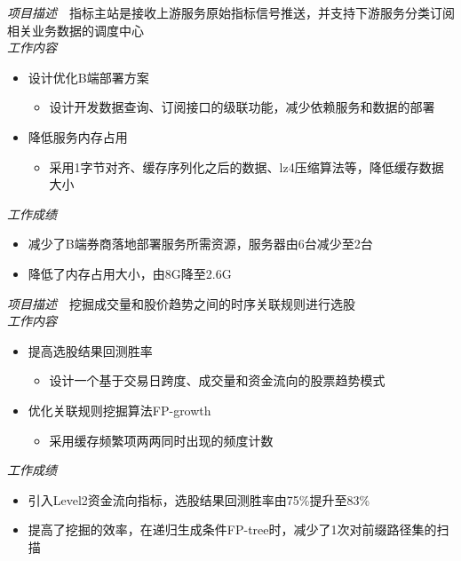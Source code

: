 \documentclass{resume}
\begin{document}
\begin{spacing}{1.5}%
\textit{项目描述}\ \ 指标主站是接收上游服务原始指标信号推送，并支持下游服务分类订阅相关业务数据的调度中心\\
\textit{工作内容}
\begin{itemize}
        \item 设计优化B端部署方案
            \begin{itemize}
                \item 设计开发数据查询、订阅接口的级联功能，减少依赖服务和数据的部署
            \end{itemize}
        \item 降低服务内存占用
            \begin{itemize}
                \item 采用1字节对齐、缓存序列化之后的数据、lz4压缩算法等，降低缓存数据大小
            \end{itemize}
        \end{itemize}
\textit{工作成绩}
\begin{itemize}
        \item 减少了B端券商落地部署服务所需资源，服务器由6台减少至2台
        \item 降低了内存占用大小，由8G降至2.6G
        \end{itemize}
\end{spacing}

\begin{spacing}{1.5}%
\textit{项目描述}\ \ 挖掘成交量和股价趋势之间的时序关联规则进行选股\\
\textit{工作内容}
\begin{itemize}
        \item 提高选股结果回测胜率
        \begin{itemize}
                \item 设计一个基于交易日跨度、成交量和资金流向的股票趋势模式
            \end{itemize}
        \item 优化关联规则挖掘算法FP-growth
        \begin{itemize}
                \item 采用缓存频繁项两两同时出现的频度计数
            \end{itemize}
        \end{itemize}
\textit{工作成绩}
\begin{itemize}
        \item 引入Level2资金流向指标，选股结果回测胜率由75\%提升至83\%
        \item 提高了挖掘的效率，在递归生成条件FP-tree时，减少了1次对前缀路径集的扫描
        \end{itemize}
\end{spacing}

\iffalse
\section{\faHeartO\ 获奖情况}
\datedline{\textit{第一名}, xxx 比赛}{2013 年6 月}
\datedline{其他奖项}{2015}
\fi
\end{document}
